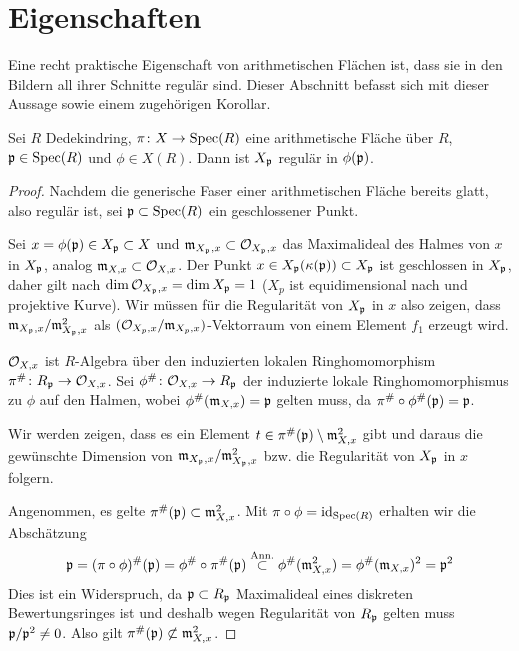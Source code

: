 \documentclass[german, bibliography=totoc]{scrreprt}
\renewcommand*{\optcite}[2][]{}
\begin{document}
\section{Eigenschaften}
Eine recht praktische Eigenschaft von arithmetischen Flächen ist, dass
sie in den Bildern all ihrer Schnitte regulär sind.
Dieser Abschnitt befasst sich mit dieser Aussage sowie einem
zugehörigen Korollar.

\begin{Lemma}\label{thm:arithflschnittbilderglatt}
  \optcite[Proposition IV.4.3]{silverman2}
  Sei $R$ Dedekindring,
  $\pi\colon X\to\operatorname{Spec}(R)$ eine arithmetische Fläche über $R$,
  $\mathfrak{p}\in\operatorname{Spec}(R)$ und $\phi\in X(R)$.
  Dann ist $X_{\mathfrak{p}}$ regulär in $\phi(\mathfrak{p})$.
  \begin{proof}
    Nachdem die generische Faser einer arithmetischen Fläche bereits
    glatt, also regulär ist, sei $\mathfrak{p}\subset\operatorname{Spec}(R)$ ein geschlossener
    Punkt.
    
    Sei $x=\phi(\mathfrak{p})\in X_{\mathfrak{p}}\subset X$ und $\mathfrak{m}_{X_{\mathfrak{p}},x}\subset\mathcal{O}_{X_{\mathfrak{p}},x}$
    das Maximalideal des Halmes von $x$ in $X_{\mathfrak{p}}$,
    analog $\mathfrak{m}_{X,x}\subset\mathcal{O}_{X,x}$.
    Der Punkt $x\in X_{\mathfrak{p}}(\kappa(\mathfrak{p}))\subset X_{\mathfrak{p}}$ ist geschlossen in $X_{\mathfrak{p}}$,
    daher gilt nach \cite[Corollary 2.5.24]{liu}
    $\dim\mathcal{O}_{X_{\mathfrak{p}},x}=\dim X_{\mathfrak{p}}=1$ ($X_p$ ist equidimensional nach
    \cite[Proposition 4.4.16]{liu} und projektive Kurve).
    Wir müssen für die Regularität von $X_{\mathfrak{p}}$ in $x$ also zeigen, dass
    $\mathfrak{m}_{X_{\mathfrak{p}},x}/\mathfrak{m}_{X_{\mathfrak{p}},x}^2$ als $(\mathcal{O}_{X_p,x}/\mathfrak{m}_{X_p,x})$-Vektorraum
    von einem Element $f_1$ erzeugt wird.
    
    $\mathcal{O}_{X,x}$ ist $R$-Algebra über den induzierten lokalen
    Ringhomomorphism $\pi^\#\colon R_{\mathfrak{p}}\to\mathcal{O}_{X,x}$.
    Sei $\phi^\#\colon\mathcal{O}_{X,x}\to R_{\mathfrak{p}}$ der induzierte lokale
    Ringhomomorphismus zu $\phi$ auf den Halmen, wobei
    $\phi^\#(\mathfrak{m}_{X,x})=\mathfrak{p}$ gelten muss, da $\pi^\#\circ\phi^\#(\mathfrak{p})=\mathfrak{p}$.
    
    Wir werden zeigen, dass es ein Element
    $t\in\pi^\#(\mathfrak{p})\setminus\mathfrak{m}_{X,x}^2$ gibt und
    daraus die gewünschte Dimension von $\mathfrak{m}_{X_{\mathfrak{p}},x}/\mathfrak{m}_{X_{\mathfrak{p}},x}^2$
    bzw. die Regularität von $X_{\mathfrak{p}}$ in $x$ folgern.

    Angenommen, es gelte $\pi^\#(\mathfrak{p})\subset\mathfrak{m}_{X,x}^2$.
    Mit $\pi\circ\phi=\mathrm{id}_{\operatorname{Spec}(R)}$ erhalten wir die Abschätzung
    \begin{gather*}
      \mathfrak{p} = (\pi\circ\phi)^\#(\mathfrak{p})
      = \phi^\#\circ\pi^\#(\mathfrak{p})
      \overset{\text{Ann.}}{\subset} \phi^\#(\mathfrak{m}_{X,x}^2)
      = \phi^\#(\mathfrak{m}_{X,x})^2
      = \mathfrak{p}^2
    \end{gather*}
    Dies ist ein Widerspruch, da $\mathfrak{p}\subset R_{\mathfrak{p}}$ Maximalideal eines
    diskreten Bewertungsringes ist und deshalb wegen Regularität von
    $R_{\mathfrak{p}}$ gelten muss $\mathfrak{p}/\mathfrak{p}^2\neq 0$.
    Also gilt $\pi^\#(\mathfrak{p})\not\subset\mathfrak{m}_{X,x}^2$.


\end{proof}
\end{Lemma}
\end{document}
